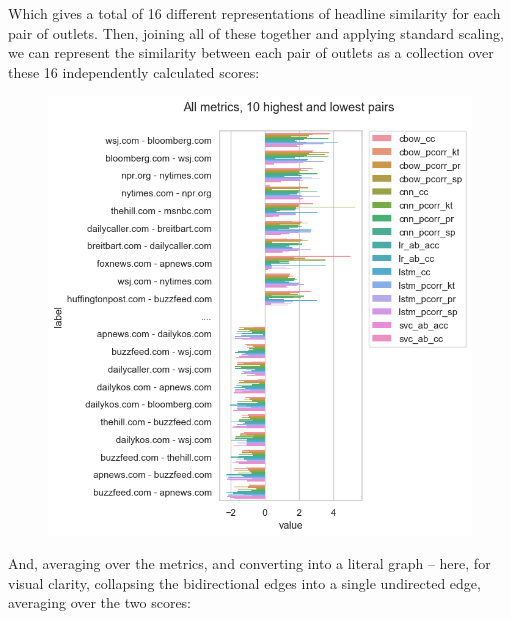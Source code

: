 \documentclass{scrartcl}
\begin{document}
Which gives a total of 16 different representations of headline similarity for each pair of outlets. Then, joining all of these together and applying standard scaling, we can represent the similarity between each pair of outlets as a collection over these 16 independently calculated scores:

\begin{figure}[H]
  \centering
  \includegraphics[height=0.4\textheight]{figures/hlg-all-tb10.png}
\end{figure}

And, averaging over the metrics, and converting into a literal graph -- here, for visual clarity, collapsing the bidirectional edges into a single undirected edge, averaging over the two scores:
\end{document}
